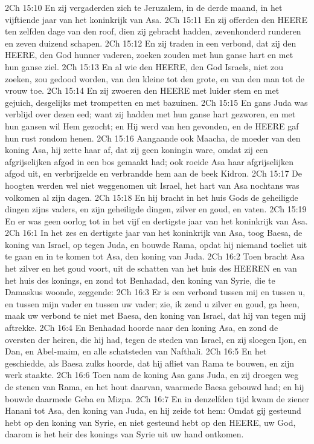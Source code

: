 2Ch 15:10  En zij vergaderden zich te Jeruzalem, in de derde maand, in het vijftiende jaar van het koninkrijk van Asa.
2Ch 15:11  En zij offerden den HEERE ten zelfden dage van den roof, dien zij gebracht hadden, zevenhonderd runderen en zeven duizend schapen.
2Ch 15:12  En zij traden in een verbond, dat zij den HEERE, den God hunner vaderen, zoeken zouden met hun ganse hart en met hun ganse ziel.
2Ch 15:13  En al wie den HEERE, den God Israels, niet zou zoeken, zou gedood worden, van den kleine tot den grote, en van den man tot de vrouw toe.
2Ch 15:14  En zij zwoeren den HEERE met luider stem en met gejuich, desgelijks met trompetten en met bazuinen.
2Ch 15:15  En gans Juda was verblijd over dezen eed; want zij hadden met hun ganse hart gezworen, en met hun gansen wil Hem gezocht; en Hij werd van hen gevonden, en de HEERE gaf hun rust rondom henen.
2Ch 15:16  Aangaande ook Maacha, de moeder van den koning Asa, hij zette haar af, dat zij geen koningin ware, omdat zij een afgrijselijken afgod in een bos gemaakt had; ook roeide Asa haar afgrijselijken afgod uit, en verbrijzelde en verbrandde hem aan de beek Kidron.
2Ch 15:17  De hoogten werden wel niet weggenomen uit Israel, het hart van Asa nochtans was volkomen al zijn dagen.
2Ch 15:18  En hij bracht in het huis Gods de geheiligde dingen zijns vaders, en zijn geheiligde dingen, zilver en goud, en vaten.
2Ch 15:19  En er was geen oorlog tot in het vijf en dertigste jaar van het koninkrijk van Asa.
2Ch 16:1  In het zes en dertigste jaar van het koninkrijk van Asa, toog Baesa, de koning van Israel, op tegen Juda, en bouwde Rama, opdat hij niemand toeliet uit te gaan en in te komen tot Asa, den koning van Juda.
2Ch 16:2  Toen bracht Asa het zilver en het goud voort, uit de schatten van het huis des HEEREN en van het huis des konings, en zond tot Benhadad, den koning van Syrie, die te Damaskus woonde, zeggende:
2Ch 16:3  Er is een verbond tussen mij en tussen u, en tussen mijn vader en tussen uw vader; zie, ik zend u zilver en goud, ga heen, maak uw verbond te niet met Baesa, den koning van Israel, dat hij van tegen mij aftrekke.
2Ch 16:4  En Benhadad hoorde naar den koning Asa, en zond de oversten der heiren, die hij had, tegen de steden van Israel, en zij sloegen Ijon, en Dan, en Abel-maim, en alle schatsteden van Nafthali.
2Ch 16:5  En het geschiedde, als Baesa zulks hoorde, dat hij afliet van Rama te bouwen, en zijn werk staakte.
2Ch 16:6  Toen nam de koning Asa gans Juda, en zij droegen weg de stenen van Rama, en het hout daarvan, waarmede Baesa gebouwd had; en hij bouwde daarmede Geba en Mizpa.
2Ch 16:7  En in denzelfden tijd kwam de ziener Hanani tot Asa, den koning van Juda, en hij zeide tot hem: Omdat gij gesteund hebt op den koning van Syrie, en niet gesteund hebt op den HEERE, uw God, daarom is het heir des konings van Syrie uit uw hand ontkomen.
